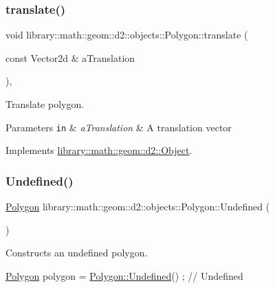 \subsubsection{\texorpdfstring{translate()}{translate()}}
{\footnotesize\ttfamily void library\+::math\+::geom\+::d2\+::objects\+::\+Polygon\+::translate (\begin{DoxyParamCaption}\item[{const Vector2d \&}]{a\+Translation }\end{DoxyParamCaption})\hspace{0.3cm}{\ttfamily [override]}, {\ttfamily [virtual]}}



Translate polygon. 


\begin{DoxyParams}[1]{Parameters}
\mbox{\tt in}  & {\em a\+Translation} & A translation vector \\
\hline
\end{DoxyParams}


Implements \hyperlink{classlibrary_1_1math_1_1geom_1_1d2_1_1_object_a00a8bec981c21c0298af86c495fe4341}{library\+::math\+::geom\+::d2\+::\+Object}.

\mbox{\label{classlibrary_1_1math_1_1geom_1_1d2_1_1objects_1_1_polygon_a86e2c184f51c1e93fce5a786457b9fc3}} 
\subsubsection{\texorpdfstring{Undefined()}{Undefined()}}
{\footnotesize\ttfamily \hyperlink{classlibrary_1_1math_1_1geom_1_1d2_1_1objects_1_1_polygon}{Polygon} library\+::math\+::geom\+::d2\+::objects\+::\+Polygon\+::\+Undefined (\begin{DoxyParamCaption}{ }\end{DoxyParamCaption})\hspace{0.3cm}{\ttfamily [static]}}



Constructs an undefined polygon. 


\begin{DoxyCode}
\hyperlink{classlibrary_1_1math_1_1geom_1_1d2_1_1objects_1_1_polygon_ad2a0b0bcd5301dbcd9e2fa101fbd220b}{Polygon} polygon = \hyperlink{classlibrary_1_1math_1_1geom_1_1d2_1_1objects_1_1_polygon_a86e2c184f51c1e93fce5a786457b9fc3}{Polygon::Undefined}() ; \textcolor{comment}{// Undefined}
\end{DoxyCode}


